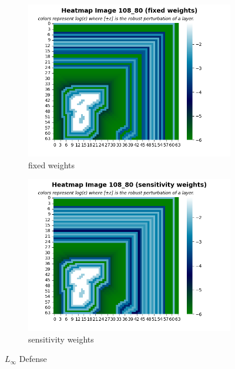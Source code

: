     \begin{figure}
         \centering
         \begin{subfigure}[b]{0.4\textwidth}
             \centering
             \includegraphics[width=\textwidth]{lInf_defense_fixed_weights.png}
             \caption{fixed weights}
             \label{sub-fig:LInf defense FW}
         \end{subfigure}
         \hfill
         \begin{subfigure}[b]{0.4\textwidth}
             \centering
             \includegraphics[width=\textwidth]{lInf_defense_sensitivity_weights.png}
             \caption{sensitivity weights}
             \label{sub-fig:LInf defense SW}
         \end{subfigure}
         \caption{$L_{\infty}$ Defense}
         \label{fig:LInf defense}
    \end{figure}
